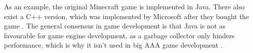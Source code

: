 As an example, the original Minecraft game is implemented in Java. There also exist a C++ version, which was implemented by Microsoft after they bought the game \cite{pcgamersn:Minecraftinc++}. The general consensus in game development is that Java is not as favourable for game engine development, as a garbage collector only hinders performance, which is why it isn't used in big AAA game development \cite{gamasutra:MemoryHandling,youtubeJonathanBlow}.





